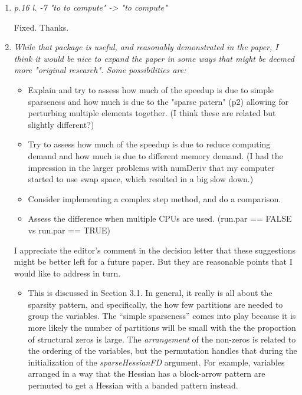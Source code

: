 \documentclass{article}
\newcommand{\class}[1]{\textsl{#1}}
\newenvironment{revQuote}{\itshape}{\vspace{\baselineskip}}
\newenvironment{response}{\normalfont}{\vspace{\baselineskip}}
\begin{document}
\begin{enumerate}[align=left]
\item\begin{revQuote}
 p.16  l. -7 "to to compute" -> "to compute"
  \end{revQuote}
  
  \begin{response}
    Fixed.  Thanks.
  \end{response}

\item\begin{revQuote}
While that package is useful, and reasonably demonstrated in the paper,
I think it would be nice to expand the paper in some ways that might be
deemed more "original research". Some possibilities are:
\begin{itemize}
 \item Explain and try to assess how much of the speedup is due to simple
sparseness and how much is due to the "sparse patern" (p2) allowing for
perturbing multiple elements together. (I think these are related but
slightly different?)
 
 \item Try to assess how much of the speedup is due to reduce computing demand
and how much is due to different memory demand. (I had the impression in the
larger problems with numDeriv that my computer started to use swap space,
which resulted in a big slow down.)
 
 \item Consider implementing a complex step method, and do a comparison.
 
 \item  Assess the difference when multiple CPUs are used. (run.par == FALSE vs
run.par == TRUE)
\end{itemize}
  \end{revQuote}
  
  \begin{response}
I appreciate the editor's comment in the decision letter that these suggestions might be
better left for a future paper.  But they are reasonable points that I
would like to address in turn.
    \begin{itemize}
    \item This is discussed in Section 3.1.  In general, it really is all about the sparsity pattern, and
      specifically, the how few partitions are needed to group the
      variables.  The ``simple sparseness'' comes into play because it
      is more likely the number of partitions will be small with the
      the proportion of structural zeros is large. The \emph{arrangement} of the non-zeros is
      related to the ordering of the variables, but the permutation
      handles that during the initialization of the
      \class{sparseHessianFD} argument.  For example, variables
      arranged in a way that the Hessian has a block-arrow pattern are
      permuted to get a Hessian with a banded pattern instead.
      

\end{itemize}
\end{response}
\end{enumerate}
\end{document}
